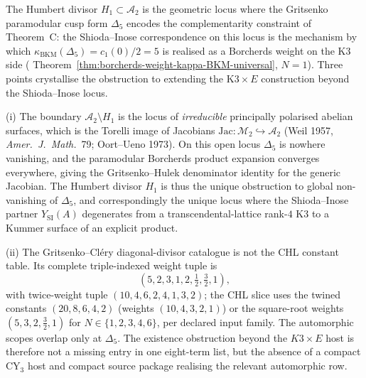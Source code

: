 \begin{remark}
\label{rem:cy-c-humbert-shioda-inose-obstruction}
The Humbert divisor $H_1 \subset \mathcal A_2$ is the geometric locus
where the Gritsenko paramodular cusp form $\Delta_5$ encodes the
complementarity constraint of Theorem~C: the Shioda--Inose
correspondence on this locus is the mechanism by which
$\kappa_{\mathrm{BKM}}(\Delta_5) = c_1(0)/2 = 5$ is realised as a
Borcherds weight on the K3 side
(\cite{VolI}
Theorem~\ref{thm:borcherds-weight-kappa-BKM-universal}, $N = 1$).
Three points crystallise the obstruction to extending the
$\mathrm{K3} \times E$ construction beyond the Shioda--Inose locus.

\textup{(i)} The boundary $\mathcal A_2 \setminus H_1$ is the locus
of \emph{irreducible} principally polarised abelian surfaces, which
is the Torelli image of Jacobians
$\mathrm{Jac}: \mathcal M_2 \hookrightarrow \mathcal A_2$ (Weil
1957, \emph{Amer.\ J.\ Math.}~79; Oort--Ueno 1973). On this open
locus $\Delta_5$ is nowhere vanishing, and the paramodular Borcherds
product expansion converges everywhere, giving the Gritsenko--Hulek
denominator identity for the generic Jacobian. The Humbert divisor
$H_1$ is thus the unique obstruction to global non-vanishing of
$\Delta_5$, and correspondingly the unique locus where the
Shioda--Inose partner $Y_{\mathrm{SI}}(A)$ degenerates from a
transcendental-lattice rank-$4$ K3 to a Kummer surface of an explicit
product.

\textup{(ii)} The Gritsenko--Cl\'ery diagonal-divisor catalogue is not
the CHL constant table. Its complete triple-indexed weight tuple is
\[
 (5,2,3,1,2,\tfrac12,\tfrac32,1),
\]
with twice-weight tuple \((10,4,6,2,4,1,3,2)\); the CHL slice uses
the twined constants \((20,8,6,4,2)\) (weights $(10,4,3,2,1)$) or the
square-root weights $(5,3,2,\tfrac32,1)$ for
\(N\in\{1,2,3,4,6\}\), per declared input family. The automorphic
scopes overlap only at \(\Delta_5\). The existence obstruction beyond the \(K3\times E\)
host is therefore not a missing entry in one eight-term list, but the
absence of a compact CY$_3$ host and compact source package realising
the relevant automorphic row.


\end{remark}
